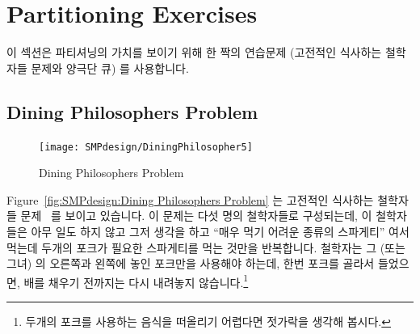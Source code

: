 
\section{Partitioning Exercises}
\label{sec:SMPdesign:Partitioning Exercises}

이 섹션은 파티셔닝의 가치를 보이기 위해 한 짝의 연습문제 (고전적인 식사하는
철학자들 문제와 양극단 큐) 를 사용합니다.

\subsection{Dining Philosophers Problem}
\label{sec:SMPdesign:Dining Philosophers Problem}

\begin{figure}[tb]
\centering
\texttt{[image: SMPdesign/DiningPhilosopher5]}
\caption{Dining Philosophers Problem}
\end{figure}

Figure~\ref{fig:SMPdesign:Dining Philosophers Problem} 는 고전적인 식사하는
철학자들 문제~\cite{Dijkstra1971HOoSP} 를 보이고 있습니다.
이 문제는 다섯 명의 철학자들로 구성되는데, 이 철학자들은 아무 일도 하지 않고
그저 생각을 하고 ``매우 먹기 어려운 종류의 스파게티'' 여서 먹는데 두개의 포크가
필요한 스파게티를 먹는 것만을 반복합니다.
철학자는 그 (또는 그녀) 의 오른쪽과 왼쪽에 놓인 포크만을 사용해야 하는데, 한번
포크를 골라서 들었으면, 배를 채우기 전까지는 다시 내려놓지 않습니다.\footnote{
	두개의 포크를 사용하는 음식을 떠올리기 어렵다면 젓가락을 생각해
	봅시다.}

